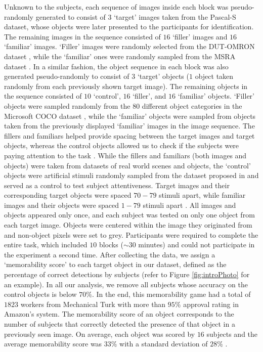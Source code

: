 Unknown to the subjects, each sequence of images inside each block was pseudo-randomly generated to consist of $3$ `target' images taken from the Pascal-S dataset, whose objects were later presented to the participants for identification. The remaining images in the sequence consisted of $16$ `filler' images and $16$ `familiar' images. `Filler' images were randomly selected from the DUT-OMRON dataset \cite{dutomron13}, while the `familiar' ones were randomly sampled from the MSRA dataset \cite{msra11}. In a similar fashion, the object sequence in each block was also generated pseudo-randomly to consist of $3$ `target' objects ($1$ object taken randomly from each previously shown target image). The remaining objects in the sequence consisted of $10$ `control', $16$ `filler', and $16$ `familiar' objects. `Filler' objects were sampled randomly from the $80$ different object categories in the Microsoft COCO dataset \cite{coco14}, while the `familiar' objects were sampled from objects taken from the previously displayed `familiar' images in the image sequence. The fillers and familiars helped provide spacing between the target images and target objects, whereas the control objects allowed us to check if the subjects were paying attention to the task \cite{brady08,isola11}. While the fillers and familiars (both images and objects) were taken from datasets of real world scenes and objects, the `control' objects were artificial stimuli randomly sampled from the dataset proposed in \cite{brady08} and served as a control to test subject attentiveness. Target images and their corresponding target objects were spaced $70-79$ stimuli apart, while familiar images and their objects were spaced $1-79$ stimuli apart . All images and objects appeared only once, and each subject was tested on only one object from each target image. Objects were centered within the image they originated from and non-object pixels were set to grey. Participants were required to complete the entire task, which included $10$ blocks ($\sim$$30$ minutes) and could not participate in the experiment a second time. After collecting the data, we assign a `memorability score' to each target object in our dataset, defined as the percentage of correct detections by subjects (refer to Figure \ref{fig:introPhoto} for an example). In all our analysis, we remove all subjects whose accuracy on the control objects is below $70\%$. In the end, this memorability game had a total of $1823$ workers from Mechanical Turk with more than $95\%$ approval rating in Amazon’s system. The memorability score of an object corresponds to the number of subjects that correctly detected the presence of that object in a previously seen image. On average, each object was scored by $16$ subjects and the average memorability score was $33\%$ with a standard deviation of  $28\%$ .
